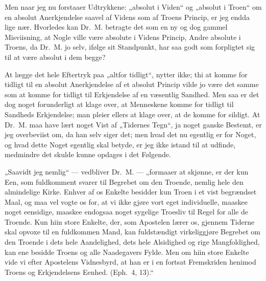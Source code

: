 Men naar jeg nu forstaaer Udtrykkene: „absolut i Viden“ og
„absolut i Troen“ om en absolut Anerkjendelse saavel af Videns som
af Troens Princip, er jeg endda lige nær. Hvorledes kan Dr.\ M.
betragte det som en ny og dog gammel Misviisning, at Nogle ville
være absolute i Videns Princip, Andre absolute i Troens, da Dr.\
M. jo selv, ifølge sit Standpunkt, har saa godt som forpligtet sig
til at være absolut i dem begge?

At lægge det hele Eftertryk paa „altfor tidligt“, nytter ikke; thi
at komme for tidligt til en absolut Anerkjendelse af et absolut
Princip vilde jo være det samme som at komme for tidligt til
Erkjendelse af en væsentlig Sandhed. Men saa er det dog noget
forunderligt at klage over, at Menneskene komme for tidligt til
Sandheds Erkjendelse; man pleier ellers at klage over, at de komme
for sildigt. At Dr.\ M. maa have lært noget Vist af „Tidernes
Tegn“, ja noget ganske Bestemt, er jeg overbeviist om, da han selv
siger det; men hvad det nu egentlig er for Noget, og hvad dette
Noget egentlig skal betyde, er jeg ikke istand til at udfinde,
medmindre det skulde kunne opdages i det Følgende.

 „Saavidt jeg nemlig“ --- vedbliver Dr.\ M. --- „formaaer at
skjønne, er der kun Een, som fuldkomment svarer til Begrebet om
den Troende, nemlig hele den almindelige Kirke. Enhver af os
Enkelte besidder kun Troen i et vist begrændset Maal, og maa vel
vogte os for, at vi ikke gjøre vort eget individuelle, maaskee
noget eensidige, maaskee endogsaa noget sygelige Troesliv til
Regel for alle de Troende. Kun hiin store Enkelte, der, som
Apostelen lærer os, gjennem Tiderne skal opvoxe til en fuldkommen
Mand, kan fuldstændigt virkeliggjøre Begrebet om den Troende i
dets hele Aandelighed, dets hele Alsidighed og rige
Mangfoldighed, kan ene besidde Troens og alle Naadegavers Fylde.
Men om hiin store Enkelte vide vi efter Apostelens Vidnesbyrd, at
han er i en fortsat Fremskriden henimod Troens og Erkjendelsens
Eenhed. (Eph.\ 4, 13).“

